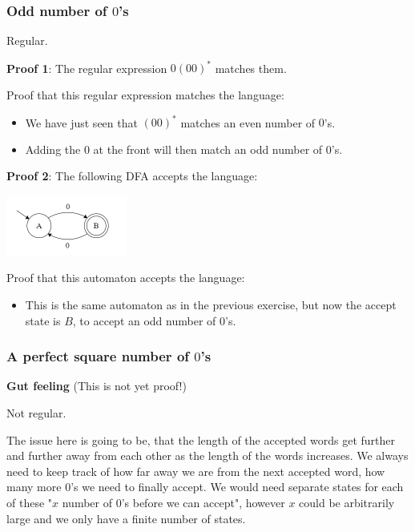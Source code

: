 \subsubsection{Odd number of $0$'s}

Regular.

\textbf{Proof 1}: The regular expression $0(00)^*$ matches them.

Proof that this regular expression matches the language:

\begin{itemize}
    \item We have just seen that $(00)^*$ matches an even number of $0$'s.
    \item Adding the $0$ at the front will then match an odd number of $0$'s.
\end{itemize}

\textbf{Proof 2}: The following DFA accepts the language:

\includegraphics[width=150px]{03/odd_zeroes.png}

Proof that this automaton accepts the language:

\begin{itemize}
    \item This is the same automaton as in the previous exercise, but now the accept state is $B$, to accept an odd number of $0$'s.
\end{itemize}

\subsubsection{A perfect square number of $0$'s}

\textbf{Gut feeling} (This is not yet proof!)

Not regular.

The issue here is going to be, that the length of the accepted words get further and further away from each other as the length of the words increases. We always need to keep track of how far away we are from the next accepted word, how many more $0$'s we need to finally accept. We would need separate states for each of these "$x$ number of $0$'s before we can accept", however $x$ could be arbitrarily large and we only have a finite number of states.

